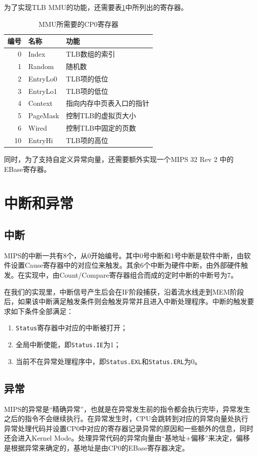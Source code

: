 为了实现TLB MMU的功能，还需要表\ref{table:mmu_cp0_registers}中所列出的寄存器。

\begin{table}[!htbp]
    \centering
    \begin{tabular}{|r|l|l|}
    \hline
    \textbf{编号} & \textbf{名称} & \textbf{功能}  \\ \hline
	0 & Index & TLB数组的索引 \\ \hline
	1 & Random & 随机数 \\ \hline
	2 & EntryLo0 & TLB项的低位 \\ \hline
	3 & EntryLo1 & TLB项的低位 \\ \hline
	4 & Context & 指向内存中页表入口的指针 \\ \hline
	5 & PageMask & 控制TLB的虚拟页大小 \\ \hline
	6 & Wired & 控制TLB中固定的页数 \\ \hline
	10 & EntryHi & TLB项的高位 \\ \hline
    \end{tabular}
    \caption{MMU所需要的CP0寄存器}
    \label{table:mmu_cp0_registers}
\end{table}

同时，为了支持自定义异常向量，还需要额外实现一个MIPS 32 Rev 2 中的 EBase寄存器。

\section{中断和异常}
\subsection{中断}
MIPS的中断一共有8个，从0开始编号。其中0号中断和1号中断是软件中断，由软件设置Cause寄存器中的对应位来触发。其余6个中断为硬件中断，由外部硬件触发。在实现中，由Count/Compare寄存器组合而成的定时中断的中断号为7。

在我们的实现里，中断信号产生后会在IF阶段捕获，沿着流水线走到MEM阶段后，如果该中断满足触发条件则会触发异常并且进入中断处理程序。中断的触发要求如下条件全部满足：
\begin{enumerate}
	\item \texttt{Status}寄存器中对应的中断被打开；
	\item 全局中断使能，即\texttt{Status.IE}为1；
	\item 当前不在异常处理程序中，即\texttt{Status.EXL}和\texttt{Status.ERL}为0。
\end{enumerate}

\subsection{异常}
MIPS的异常是“精确异常”，也就是在异常发生前的指令都会执行完毕，异常发生之后的指令不会继续执行。在异常发生时，CPU会跳转到对应的异常向量处执行异常处理代码并设置CP0中对应的寄存器记录异常的原因和一些额外的信息，同时还会进入Kernel Mode。处理异常代码的异常向量由“基地址+偏移”来决定，偏移是根据异常来确定的，基地址是由CP0的EBase寄存器决定。


